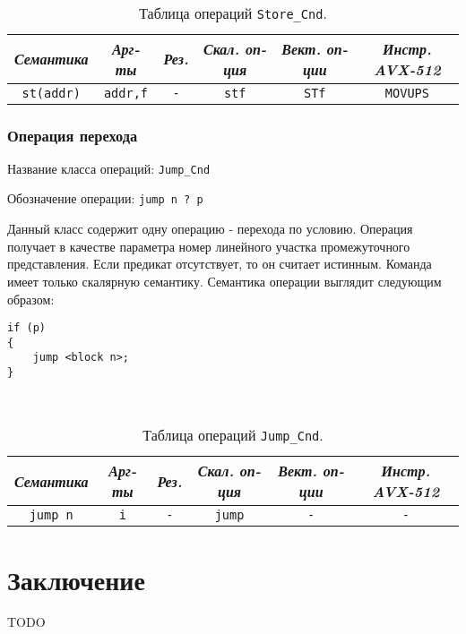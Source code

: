 \documentclass[a4paper,12pt]{extarticle}                     %
\numberwithin{equation}{section}                             %
\numberwithin{figure}{section}                               %
\numberwithin{table}{section}                                %
\theoremstyle{plain}                                         %
\numberwithin{theorem}{section}                              %
\numberwithin{lemma}{section}                                %
\numberwithin{definition}{section}                           %
\begin{document}
\

\begin{table}[!h]
\setcaptionmargin{0mm}
\onelinecaptionsfalse
{}
\caption{Таблица операций \texttt{Store\_Cnd}.}
\bigskip
\begin{tabular}{|c|c|c|c|c|c|}
\hline
\textit{Семантика} & \textit{Арг-ты} & \textit{Рез.} & \textit{Скал. оп-ция} & \textit{Вект. оп-ции} & \textit{Инстр. AVX-512} \\
\hline
\texttt{st(addr)} & \texttt{addr,f} & \texttt{-} & \texttt{stf} & \texttt{STf} & \texttt{MOVUPS} \\
\hline
\end{tabular}
\end{table}

\newpage

\subsubsection{Операция перехода}

Название класса операций: \texttt{Jump\_Cnd}

Обозначение операции: \texttt{jump n ? p}

Данный класс содержит одну операцию - перехода по условию. Операция получает в качестве параметра номер линейного участка промежуточного представления. Если предикат отсутствует, то он считает истинным. Команда имеет только скалярную семантику. Семантика операции выглядит следующим образом:

\begin{lstlisting}[caption={Псевдокод операции Jump\_Cnd.}]
if (p)
{
	jump <block n>;
}

\end{lstlisting}

\

\begin{table}[!h]
\setcaptionmargin{0mm}
\onelinecaptionsfalse
{}
\caption{Таблица операций \texttt{Jump\_Cnd}.}
\bigskip
\begin{tabular}{|c|c|c|c|c|c|}
\hline
\textit{Семантика} & \textit{Арг-ты} & \textit{Рез.} & \textit{Скал. оп-ция} & \textit{Вект. оп-ции} & \textit{Инстр. AVX-512} \\
\hline
\texttt{jump n} & \texttt{i} & \texttt{-} & \texttt{jump} & \texttt{-} & \texttt{-} \\
\hline
\end{tabular}
\end{table}

\newpage

\section*{Заключение}                                        %

TODO

\newpage


\end{document}
